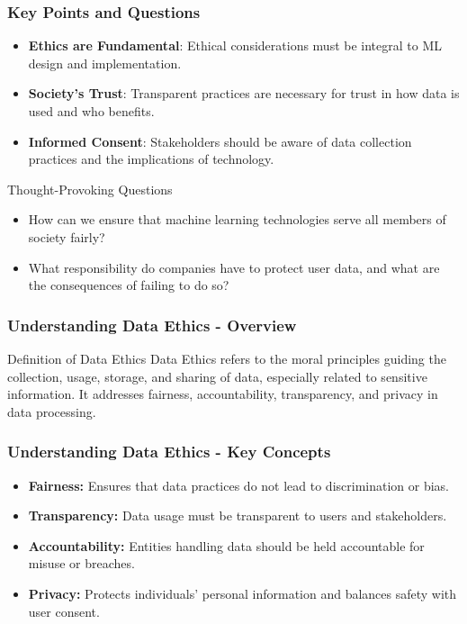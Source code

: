 \documentclass[aspectratio=169]{beamer}
\begin{document}
\begin{frame}[fragile]
    \frametitle{Key Points and Questions}
    \begin{itemize}
        \item \textbf{Ethics are Fundamental}: Ethical considerations must be integral to ML design and implementation.
        \item \textbf{Society's Trust}: Transparent practices are necessary for trust in how data is used and who benefits.
        \item \textbf{Informed Consent}: Stakeholders should be aware of data collection practices and the implications of technology.
    \end{itemize}

    \begin{block}{Thought-Provoking Questions}
        \begin{itemize}
            \item How can we ensure that machine learning technologies serve all members of society fairly?
            \item What responsibility do companies have to protect user data, and what are the consequences of failing to do so?
        \end{itemize}
    \end{block}
\end{frame}

\begin{frame}[fragile]
    \frametitle{Understanding Data Ethics - Overview}
    \begin{block}{Definition of Data Ethics}
        Data Ethics refers to the moral principles guiding the collection, usage, storage, and sharing of data, especially related to sensitive information. It addresses fairness, accountability, transparency, and privacy in data processing.
    \end{block}
\end{frame}

\begin{frame}[fragile]
    \frametitle{Understanding Data Ethics - Key Concepts}
    \begin{itemize}
        \item \textbf{Fairness:} Ensures that data practices do not lead to discrimination or bias.
        \item \textbf{Transparency:} Data usage must be transparent to users and stakeholders.
        \item \textbf{Accountability:} Entities handling data should be held accountable for misuse or breaches.
        \item \textbf{Privacy:} Protects individuals' personal information and balances safety with user consent.
    \end{itemize}
\end{frame}
\end{document}
